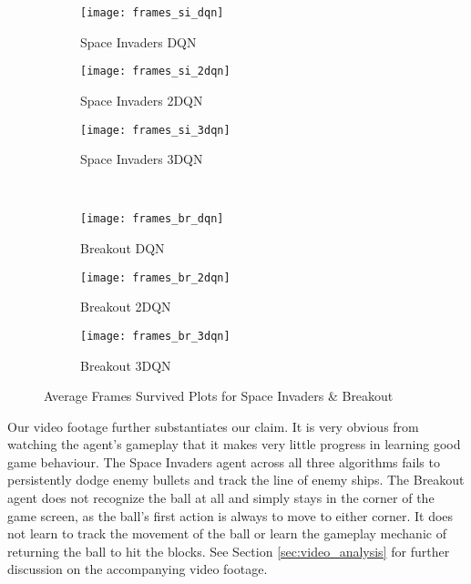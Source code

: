 \begin{figure}[H]
	\centering
	\begin{subfigure}{.3\textwidth}
		\centering
		\texttt{[image: frames\_si\_dqn]}
		\caption{Space Invaders DQN}
		\label{subfig:frames_si_dqn}
	\end{subfigure}%
	\begin{subfigure}{.3\textwidth}
		\centering
		\texttt{[image: frames\_si\_2dqn]}
		\caption{Space Invaders 2DQN}
		\label{subfig:frames_si_2dqn}
	\end{subfigure}%
	\begin{subfigure}{.3\textwidth}
		\centering
		\texttt{[image: frames\_si\_3dqn]}
		\caption{Space Invaders 3DQN}
		\label{subfig:frames_si_3dqn}
	\end{subfigure}
	\\
	\begin{subfigure}{.3\textwidth}
		\centering
		\texttt{[image: frames\_br\_dqn]}
		\caption{Breakout DQN}
		\label{subfig:frames_br_dqn}
	\end{subfigure}%
	\begin{subfigure}{.3\textwidth}
		\centering
		\texttt{[image: frames\_br\_2dqn]}
		\caption{Breakout 2DQN}
		\label{subfig:frames_br_2dqn}
	\end{subfigure}
	\begin{subfigure}{.3\textwidth}
		\centering
		\texttt{[image: frames\_br\_3dqn]}
		\caption{Breakout 3DQN}
		\label{subfig:frames_br_3dqn}
	\end{subfigure}
	\caption{Average Frames Survived Plots for Space Invaders \& Breakout}
	\label{fig:frames_plots}
\end{figure}

Our video footage further substantiates our claim. It is very obvious from watching the agent's gameplay that it makes very little progress in learning good game behaviour. The Space Invaders agent across all three algorithms fails to persistently dodge enemy bullets and track  the line of enemy ships. The Breakout agent does not recognize the ball at all and simply stays in the corner of the game screen, as the ball's first action is always to move to either corner. It does not learn to track the movement of the ball or learn the gameplay mechanic of returning the ball to hit the blocks. See Section \ref{sec:video_analysis} for further discussion on the accompanying video footage. \paragraph{}

